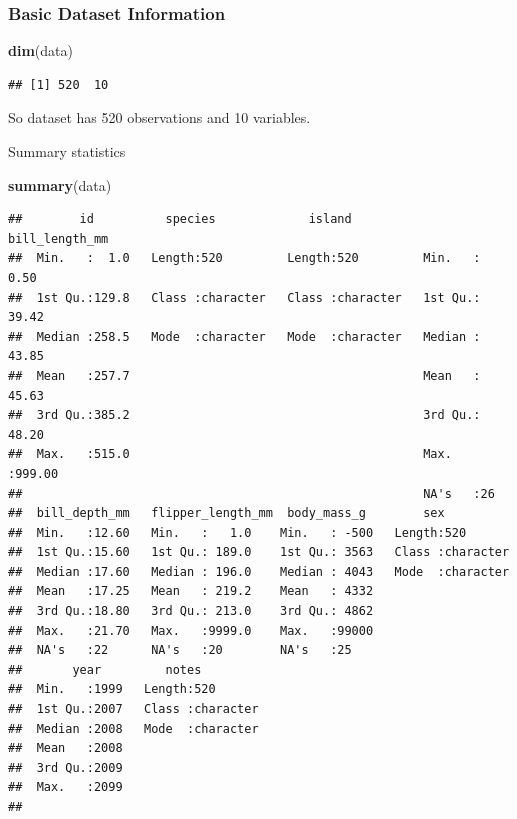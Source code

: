 \documentclass[
]{article}
\newenvironment{Shaded}{\begin{snugshade}}{\end{snugshade}}
\newcommand{\FunctionTok}[1]{\textcolor[rgb]{0.13,0.29,0.53}{\textbf{#1}}}
\newcommand{\NormalTok}[1]{#1}
\begin{document}
\subsubsection{Basic Dataset
Information}\label{basic-dataset-information}

\begin{Shaded}
\begin{Highlighting}[]
\FunctionTok{dim}\NormalTok{(data)}
\end{Highlighting}
\end{Shaded}

\begin{verbatim}
## [1] 520  10
\end{verbatim}

So dataset has 520 observations and 10 variables.

Summary statistics

\begin{Shaded}
\begin{Highlighting}[]
\FunctionTok{summary}\NormalTok{(data)}
\end{Highlighting}
\end{Shaded}

\begin{verbatim}
##        id          species             island          bill_length_mm  
##  Min.   :  1.0   Length:520         Length:520         Min.   :  0.50  
##  1st Qu.:129.8   Class :character   Class :character   1st Qu.: 39.42  
##  Median :258.5   Mode  :character   Mode  :character   Median : 43.85  
##  Mean   :257.7                                         Mean   : 45.63  
##  3rd Qu.:385.2                                         3rd Qu.: 48.20  
##  Max.   :515.0                                         Max.   :999.00  
##                                                        NA's   :26      
##  bill_depth_mm   flipper_length_mm  body_mass_g        sex           
##  Min.   :12.60   Min.   :   1.0    Min.   : -500   Length:520        
##  1st Qu.:15.60   1st Qu.: 189.0    1st Qu.: 3563   Class :character  
##  Median :17.60   Median : 196.0    Median : 4043   Mode  :character  
##  Mean   :17.25   Mean   : 219.2    Mean   : 4332                     
##  3rd Qu.:18.80   3rd Qu.: 213.0    3rd Qu.: 4862                     
##  Max.   :21.70   Max.   :9999.0    Max.   :99000                     
##  NA's   :22      NA's   :20        NA's   :25                        
##       year         notes          
##  Min.   :1999   Length:520        
##  1st Qu.:2007   Class :character  
##  Median :2008   Mode  :character  
##  Mean   :2008                     
##  3rd Qu.:2009                     
##  Max.   :2099                     
## 
\end{verbatim}
\end{document}
